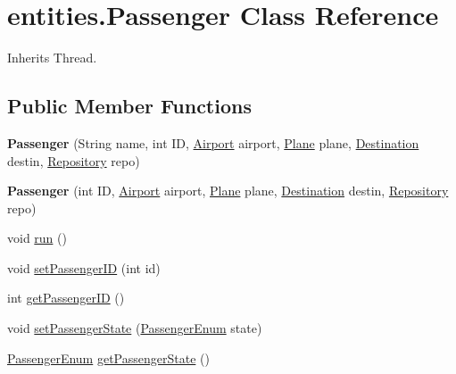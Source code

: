 \hypertarget{classentities_1_1_passenger}{}\section{entities.\+Passenger Class Reference}
\label{classentities_1_1_passenger}


Inherits Thread.

\subsection*{Public Member Functions}
\begin{DoxyCompactItemize}
\item 
\mbox{\label{classentities_1_1_passenger_a83a5347da742c0402eb206c771e797d7}} 
{\bfseries Passenger} (String name, int ID, \hyperlink{classshared_regions_1_1_airport}{Airport} airport, \hyperlink{classshared_regions_1_1_plane}{Plane} plane, \hyperlink{classshared_regions_1_1_destination}{Destination} destin, \hyperlink{classshared_regions_1_1_repository}{Repository} repo)
\item 
\mbox{\label{classentities_1_1_passenger_a90938dda88f21caa028a836449c2647c}} 
{\bfseries Passenger} (int ID, \hyperlink{classshared_regions_1_1_airport}{Airport} airport, \hyperlink{classshared_regions_1_1_plane}{Plane} plane, \hyperlink{classshared_regions_1_1_destination}{Destination} destin, \hyperlink{classshared_regions_1_1_repository}{Repository} repo)
\item 
void \hyperlink{classentities_1_1_passenger_a7d58b79f61a46da11478760937d80c12}{run} ()
\item 
void \hyperlink{classentities_1_1_passenger_a007debe9191129c632c738311e15a7c4}{set\+Passenger\+ID} (int id)
\item 
int \hyperlink{classentities_1_1_passenger_a02039d310b9abd8d76438f86c4dd071f}{get\+Passenger\+ID} ()
\item 
void \hyperlink{classentities_1_1_passenger_a15abb0fe38c3f003d4a7257e8736a562}{set\+Passenger\+State} (\hyperlink{enumentities_1_1_passenger_enum}{Passenger\+Enum} state)
\item 
\hyperlink{enumentities_1_1_passenger_enum}{Passenger\+Enum} \hyperlink{classentities_1_1_passenger_af9b423b481bf216dfe8fe019919e74fe}{get\+Passenger\+State} ()
\end{DoxyCompactItemize}


